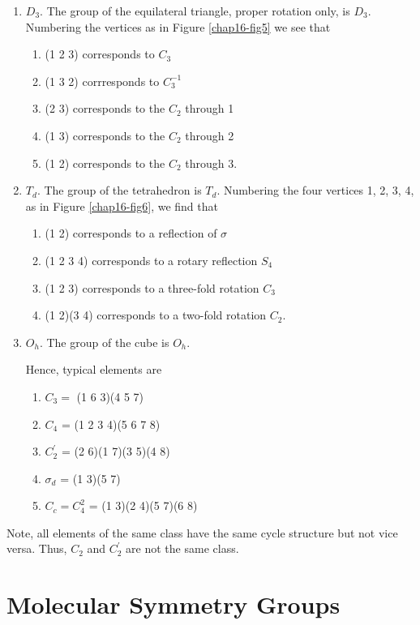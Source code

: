 \begin{enumerate}
\item $D_3$.  The group of the equilateral triangle, proper 
rotation only, is $D_3$.  Numbering the vertices as in Figure
\ref{chap16-fig5}
we see that
  \begin{enumerate}
    \item (1 2 3) corresponds to $C_3$
    \item (1 3 2) corrresponds to $C_3^{-1}$
    \item (2 3) corresponds to the $C_2$ through 1
    \item (1 3) corresponds to the $C_2$ through 2
    \item (1 2) corresponds to the $C_2$ through 3.
  \end{enumerate}
\item $T_d$.  The group of the tetrahedron is $T_d$.  Numbering the
four vertices 1, 2, 3, 4, as in Figure \ref{chap16-fig6}, we find that
  \begin{enumerate}
    \item (1 2) corresponds to a reflection of $\sigma$
    \item (1 2 3 4) corresponds to a rotary reflection $S_4$
    \item (1 2 3) corresponds to a three-fold rotation $C_3$
    \item (1 2)(3 4) corresponds to a two-fold rotation $C_2$.
  \end{enumerate}

\item $O_h$.  The group of the cube is $O_h$.

Hence, typical elements are
  \begin{enumerate}
    \item $C_3 =$ (1 6 3)(4 5 7)
    \item $C_4$ = (1 2 3 4)(5 6 7 8)
    \item $C^{\prime}_2$ = (2 6)(1 7)(3 5)(4 8)
    \item $\sigma_d$ = (1 3)(5 7)
    \item $C_c = C^2_4$ = (1 3)(2 4)(5 7)(6 8)
  \end{enumerate}
\end{enumerate}

Note, all elements of the same class have the same cycle 
structure but not vice versa.  Thus, $C_2$ and $C^{\prime}_2$ are not 
the same class.

\section{Molecular Symmetry Groups}

